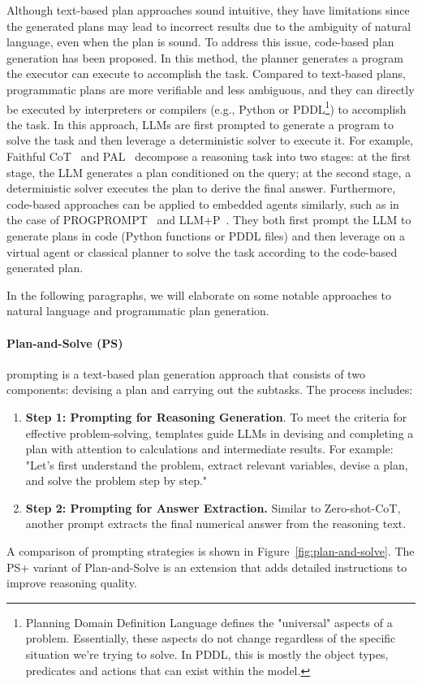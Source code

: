 Although text-based plan approaches sound intuitive, they have limitations since the generated plans may lead to incorrect results due to the ambiguity of natural language, even when the plan is sound.
To address this issue, code-based plan generation has been proposed.
In this method, the planner generates a program the executor can execute to accomplish the task.
Compared to text-based plans, programmatic plans are more verifiable and less ambiguous, and they can directly be executed by interpreters or compilers (e.g., Python or PDDL\footnote{Planning Domain Definition Language defines the "universal" aspects of a problem. Essentially, these aspects do not change regardless of the specific situation we’re trying to solve. In PDDL, this is mostly the object types, predicates and actions that can exist within the model.}) to accomplish the task.
In this approach, LLMs are first prompted to generate a program to solve the task and then leverage a deterministic solver to execute it.
For example, Faithful CoT~\cite{lyu2023faithful} and PAL~\cite{gao2022pal} decompose a reasoning task into two stages: at the first stage, the LLM generates a plan conditioned on the query; at the second stage, a deterministic solver executes the plan to derive the final answer.
Furthermore, code-based approaches can be applied to embedded agents similarly, such as in the case of PROGPROMPT~\cite{singh2022progprompt} and LLM+P~\cite{liu2023llmp}.
They both first prompt the LLM to generate plans in code (Python functions or PDDL files) and then leverage on a virtual agent or classical planner to solve the task according to the code-based generated plan.

In the following paragraphs, we will elaborate on some notable approaches to natural language and programmatic plan generation.

\paragraph{Plan-and-Solve (PS)}
\label{par:plan-and-solve}

prompting is a text-based plan generation approach that consists of two components: devising a plan and carrying out the subtasks.
The process includes:
\begin{enumerate}
	\item \textbf{Step 1: Prompting for Reasoning Generation}. To meet the criteria for effective problem-solving, templates guide LLMs in devising and completing a plan with attention to calculations and intermediate results. For example: "Let's first understand the problem, extract relevant variables, devise a plan, and solve the problem step by step."
	\item \textbf{Step 2: Prompting for Answer Extraction.} Similar to Zero-shot-CoT, another prompt extracts the final numerical answer from the reasoning text.
\end{enumerate}
A comparison of prompting strategies is shown in Figure~\ref{fig:plan-and-solve}.
The PS+ variant of Plan-and-Solve is an extension that adds detailed instructions to improve reasoning quality.

